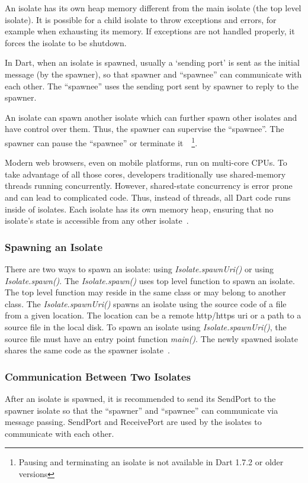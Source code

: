   An isolate has its own heap memory different from the main isolate (the top level isolate). It is possible for a child isolate to throw exceptions and errors, for example when exhausting its memory. If exceptions are not handled properly, it forces the isolate to be shutdown.

  In Dart, when an isolate is spawned, usually a ‘sending port’ is sent as the initial message (by the spawner), so that spawner and “spawnee” can communicate with each other. The “spawnee” uses the sending port sent by spawner to reply to the spawner.

  An isolate can spawn another isolate which can further spawn other isolates and have control over them. Thus, the spawner can supervise the “spawnee”. The spawner can pause the “spawnee” or terminate it~\cite{dartApiIsolate}~\footnote{Pausing and terminating an isolate is not available in Dart 1.7.2 or older versions}.

  Modern web browsers, even on mobile platforms, run on multi-core CPUs. To take advantage of all those cores, developers traditionally use shared-memory threads running concurrently. However, shared-state concurrency is error prone and can lead to complicated code. Thus, instead of threads, all Dart code runs inside of isolates. Each isolate has its own memory heap, ensuring that no isolate’s state is accessible from any other isolate~\parencite{laddWalrath}.

  \subsubsection{Spawning an Isolate}
    There are two ways to spawn an isolate: using \emph{Isolate.spawnUri()} or using \emph{Isolate.spawn()}. The \emph{Isolate.spawn()} uses top level function to spawn an isolate. The top level function may reside in the same class or may belong to another class. The \emph{Isolate.spawnUri()} spawns an isolate using the source code of a file from a given location. The location can be a remote http/https \acrshort{uri} or a path to a source file in the local disk. To spawn an isolate using \emph{Isolate.spawnUri()}, the source file must have an entry point function \emph{main()}.
    The newly spawned isolate shares the same code as the spawner isolate~\cite{dartApiIsolate}.

  \subsubsection{Communication Between Two Isolates}
  After an isolate is spawned, it is recommended to send its SendPort to the spawner isolate so that the “spawner” and “spawnee” can communicate via message passing. SendPort and ReceivePort are used by the isolates to communicate with each other.

